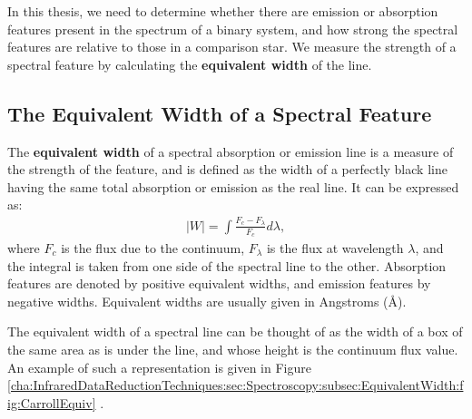 \vspace{\myparskip}

In this thesis, we need to determine whether there are emission or absorption features present in the spectrum of a binary system, and how strong the spectral features are relative to those in a comparison star. We measure the strength of a spectral
feature by calculating the \textbf{equivalent width} of the line. %


\subsection{The Equivalent Width of a Spectral Feature}
\label{cha:InfraredDataReductionTechniques:sec:Spectroscopy:subsec:EquivalentWidth}

The \textbf{equivalent width} of a spectral absorption or emission line is a measure of the strength
of the feature, and is defined as the width of a perfectly black line
having the same total absorption or emission as the real line. It can
be expressed as:
\begin{eqnarray}
\label{cha:InfraredDataReductionTechniques:sec:Spectroscopy:subsec:EquivalentWidth:eqn:equiv}
|W| = \int \frac{F_c - F_{\lambda}}{F_c} d\lambda,
\end{eqnarray}
where $F_c$ is the flux due to the continuum, $F_{\lambda}$ is the
flux at wavelength $\lambda$, and the integral is taken from one side
of the spectral line to the other. Absorption features are denoted by
positive equivalent widths, and emission features by negative
widths. Equivalent widths are usually given in Angstroms (\AA). %

\vspace{\myparskip}

The equivalent width of a spectral line can be thought of as the width
of a box of the same area as is under the line, and whose height is the
continuum flux value. An example of such a representation is given in
Figure~%
\vref{cha:InfraredDataReductionTechniques:sec:Spectroscopy:subsec:EquivalentWidth:fig:CarrollEquiv}%
. %

